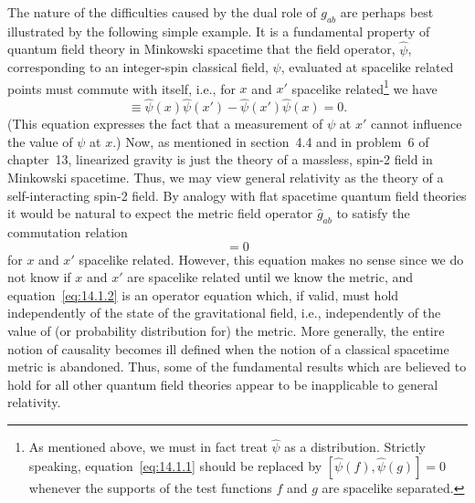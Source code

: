 The nature of the difficulties caused by the dual role of \(g_{ab}\) are perhaps best
illustrated by the following simple example. It is a fundamental property of quantum
field theory in Minkowski spacetime that the field operator, \(\widehat\psi\), corresponding to an
integer-spin classical field, \(\psi\), evaluated at spacelike related points must commute
with itself, i.e., for \(x\) and \(x'\) spacelike related\footnote{As mentioned above, we
must in fact treat \(\widehat\psi\) as a distribution. Strictly speaking,
equation~\eqref{eq:14.1.1} should be replaced by
\([\widehat\psi(f),\widehat\psi(g)]=0\) whenever the supports of the test functions
\(f\) and \(g\) are spacelike separated.} we have
\begin{equation}
  [\widehat\psi(x),\widehat\psi(x')]
  \equiv\widehat\psi(x)\widehat\psi(x')-\widehat\psi(x')\widehat\psi(x)=0.
  \tag{14.1.1}\label{eq:14.1.1}
\end{equation}
(This equation expresses the fact that a measurement of \(\psi\) at \(x'\) cannot influence the
value of \(\psi\) at \(x\).) Now, as mentioned in section~4.4 and in problem~6 of chapter~13,
linearized gravity is just the theory of a massless, spin-2 field in Minkowski spacetime.
Thus, we may view general relativity as the theory of a self-interacting spin-2
field. By analogy with flat spacetime quantum field theories it would be natural to
expect the metric field operator \(\widehat g_{ab}\) to satisfy the commutation relation
\begin{equation}
  [\widehat g_{ab}(x),\widehat g_{cd}(x')]=0
  \tag{14.1.2}\label{eq:14.1.2}
\end{equation}
for \(x\) and \(x'\) spacelike related. However, this equation makes no sense since we do
not know if \(x\) and \(x'\) are spacelike related until we know the metric, and
equation~\eqref{eq:14.1.2} is an operator equation which, if valid, must hold independently
of the state of the gravitational field, i.e., independently of the value of (or probability
distribution for) the metric. More generally, the entire notion of causality becomes ill
defined when the notion of a classical spacetime metric is abandoned. Thus, some of
the fundamental results which are believed to hold for all other quantum field theories
appear to be inapplicable to general relativity.

